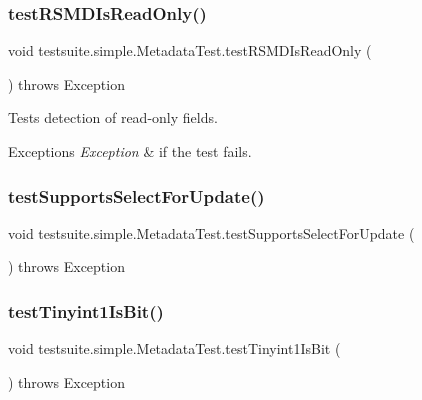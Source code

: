 \subsubsection{\texorpdfstring{test\+R\+S\+M\+D\+Is\+Read\+Only()}{testRSMDIsReadOnly()}}
{\footnotesize\ttfamily void testsuite.\+simple.\+Metadata\+Test.\+test\+R\+S\+M\+D\+Is\+Read\+Only (\begin{DoxyParamCaption}{ }\end{DoxyParamCaption}) throws Exception}

Tests detection of read-\/only fields.


\begin{DoxyExceptions}{Exceptions}
{\em Exception} & if the test fails. \\
\hline
\end{DoxyExceptions}
\mbox{\label{classtestsuite_1_1simple_1_1_metadata_test_a630efab4cd749e3ac7289c477d005d67}} 
\subsubsection{\texorpdfstring{test\+Supports\+Select\+For\+Update()}{testSupportsSelectForUpdate()}}
{\footnotesize\ttfamily void testsuite.\+simple.\+Metadata\+Test.\+test\+Supports\+Select\+For\+Update (\begin{DoxyParamCaption}{ }\end{DoxyParamCaption}) throws Exception}

\mbox{\label{classtestsuite_1_1simple_1_1_metadata_test_aff832408212ac641e00a62d686e3c528}} 
\subsubsection{\texorpdfstring{test\+Tinyint1\+Is\+Bit()}{testTinyint1IsBit()}}
{\footnotesize\ttfamily void testsuite.\+simple.\+Metadata\+Test.\+test\+Tinyint1\+Is\+Bit (\begin{DoxyParamCaption}{ }\end{DoxyParamCaption}) throws Exception}

